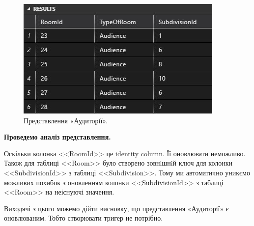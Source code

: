 \documentclass[a4paper,12pt]{article}
\begin{document}
\newpage
	\begin{figure}[h!]
		\begin{minipage}[h]{1\linewidth}
			\centering
			\includegraphics[width=0.6\linewidth]{Prt sc/Figure_2.jpg}  
		\end{minipage}
		\caption{Представлення «Аудиторiї».}
	\end{figure}
	\begin{center}
		\textbf{Проведемо аналіз представлення.}
	\end{center}

	Оскільки колонка <<RoomId>> це identity column. Її оновлювати неможливо. Також для таблиці <<Room>> було створено 
	зовнiшнiй ключ для колонки <<SubdivisionId>> з таблиці <<Subdivision>>. Тому ми автоматично уникємо можливих
	похибок з оновленням колонки <<SubdivisionId>> з таблиці <<Room>> на неіснуючі значення. 

	Виходячі з цього можемо дійти висновку, що представлення «Аудиторiї» є оновлюваним. Тобто створювати тригер не потрібно.
\end{document}
